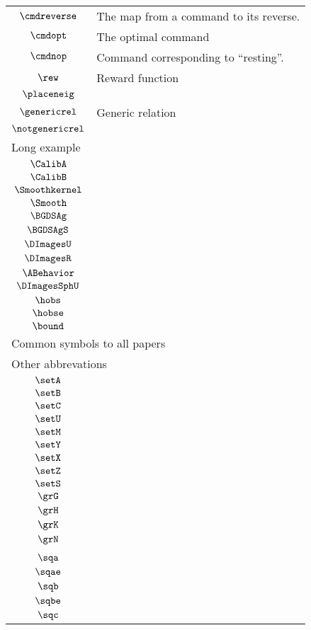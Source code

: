 \begin{longtable}{cl}
 $\cmdreverse$ &  The map from a command to its reverse.\\ 
 $\cmdopt$ &  The optimal command\\ 
 $\cmdnop$ &  Command corresponding to ``resting''.\\ 
 $\rew$ &  Reward function\\ 
 $\placeneig$ & \\ 
 $\genericrel$ &  Generic relation\\ 
 $\notgenericrel$ & \\ 
 \multicolumn{2}{l}{Long example}\\ 
 \hline
$\CalibA$ & \\ 
 $\CalibB$ & \\ 
 $\Smoothkernel$ & \\ 
 $\Smooth$ & \\ 
 $\BGDSAg$ & \\ 
 $\BGDSAgS$ & \\ 
 $\DImagesU$ & \\ 
 $\DImagesR$ & \\ 
 $\ABehavior$ & \\ 
 $\DImagesSphU$ & \\ 
 $\hobs$ & \\ 
 $\hobse$ & \\ 
 $\bound$ & \\ 
 \multicolumn{2}{l}{Common symbols to all papers}\\ 
 \hline
\hline
\multicolumn{2}{l}{Other abbrevations}\\ 
 \hline
$\setA$ & \\ 
 $\setB$ & \\ 
 $\setC$ & \\ 
 $\setU$ & \\ 
 $\setM$ & \\ 
 $\setY$ & \\ 
 $\setX$ & \\ 
 $\setZ$ & \\ 
 $\setS$ & \\ 
 $\grG$ & \\ 
 $\grH$ & \\ 
 $\grK$ & \\ 
 $\grN$ & \\ 
 \multicolumn{2}{l}{}\\ 
 \hline
$\sqa$ & \\ 
 $\sqae$ & \\ 
 $\sqb$ & \\ 
 $\sqbe$ & \\ 
 $\sqc$ & \\ 

\end{longtable}
